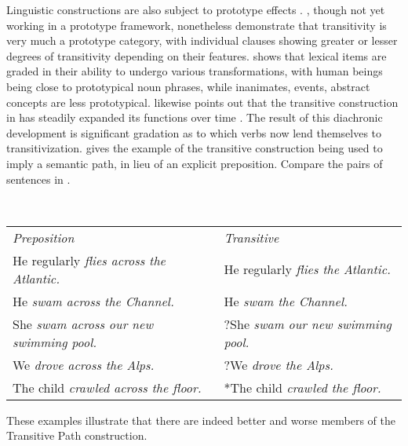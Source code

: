 Linguistic constructions are also subject to prototype effects \parencite[Ch.~12]{Taylor2003}. \textcite{HopperThompson1980}, though not yet working in a prototype framework, nonetheless demonstrate that transitivity is very much a prototype category, with individual clauses showing greater or lesser degrees of transitivity depending on their features. \textcite{Ross1972} shows that lexical items are graded in their ability to undergo various transformations, with human beings being close to prototypical noun phrases, while inanimates, events, abstract concepts are less prototypical. \textcite[§12.5]{Taylor2003} likewise points out that the transitive construction in  has steadily expanded its functions over time . The result of this diachronic development is significant gradation as to which verbs now lend themselves to transitivization. \textcite[236]{Taylor2003} gives the example of the transitive construction being used to imply a semantic path, in lieu of an explicit preposition. Compare the pairs of  sentences in .

\begin{exe}
  \ex\label{ex:2.21}
  \hspace{0.5em}\\
  \begin{tabular}[t]{ l l }
    \textit{Preposition}                         & \textit{Transitive}\\
    He regularly \em{flies across} the Atlantic. & He regularly \em{flies} the Atlantic.\\
    He \em{swam across} the Channel.             & He \em{swam} the Channel.\\
    She \em{swam across} our new swimming pool.  & ?She \em{swam} our new swimming pool.\\
    We \em{drove across} the Alps.               & ?We \em{drove} the Alps.\\
    The child \em{crawled across} the floor.     & *The child \em{crawled} the floor.\\
  \end{tabular}
  \vspace{0.5em}
\end{exe}

\noindent These examples illustrate that there are indeed better and worse members of the  Transitive Path construction.

